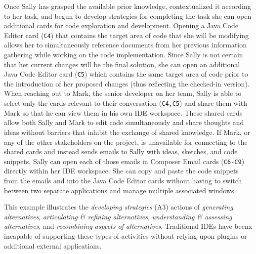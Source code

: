 \documentclass{ppig}
\begin{document}
Once Sally has grasped the available prior knowledge, contextualized it according to her task, and begun to develop strategies for completing the task she can open additional cards for code exploration and development.
Opening a Java Code Editor card (\texttt{C4}) that contains the target area of code that she will be modifying allows her to simultaneously reference documents from her previous information gathering while working on the code implementation.
Since Sally is not certain that her current changes will be the final solution, she can open an additional Java Code Editor card (\texttt{C5}) which contains the same target area of code prior to the introduction of her proposed changes (thus reflecting the checked-in version).
When reaching out to Mark, the senior developer on her team, Sally is able to select only the cards relevant to their conversation (\texttt{C4,C5}) and share them with Mark so that he can view them in his own IDE workspace.
These shared cards allow both Sally and Mark to edit code simultaneously and share thoughts and ideas without barriers that inhibit the exchange of shared knowledge.
If Mark, or any of the other stakeholders on the project, is unavailable for connecting to the shared cards and instead sends emails to Sally with ideas, sketches, and code snippets, Sally can open each of those emails in Composer Email cards (\texttt{C6-C9}) directly within her IDE workspace.
She can copy and paste the code snippets from the emails and into the Java Code Editor cards without having to switch between two separate applications and manage multiple associated windows.



This example illustrates the \textit{developing strategies} (A3) actions of \textit{generating alternatives}, \textit{articulating \& refining alternatives}, \textit{understanding \& assessing alternatives}, and \textit{recombining aspects of alternatives}.
Traditional IDEs have beenx incapable of supporting these types of activities without relying upon plugins or additional external applications.


 
\end{document}
